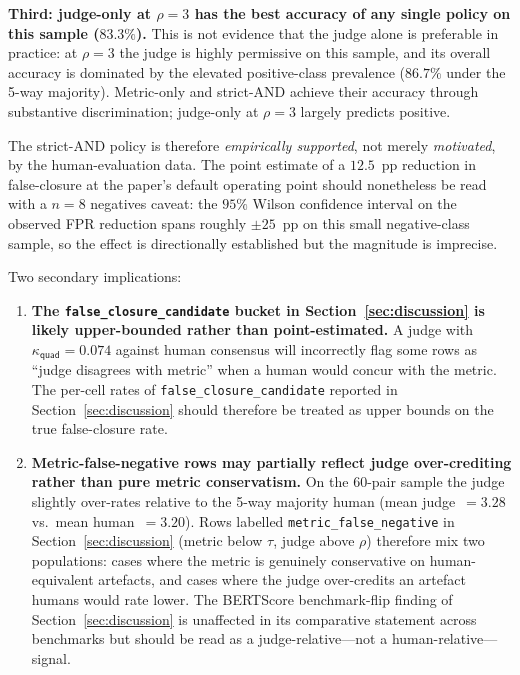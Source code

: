 \textbf{Third: judge-only at $\rho = 3$ has the best accuracy of any
single policy on this sample ($83.3\%$).} This is not evidence that the
judge alone is preferable in practice: at $\rho = 3$ the judge is
highly permissive on this sample, and its overall accuracy is dominated
by the elevated positive-class prevalence ($86.7\%$ under the 5-way
majority). Metric-only and strict-AND achieve their accuracy through
substantive discrimination; judge-only at $\rho = 3$ largely predicts
positive.

The strict-AND policy is therefore \emph{empirically supported}, not
merely \emph{motivated}, by the human-evaluation data. The point
estimate of a $12.5$~pp reduction in false-closure at the paper's
default operating point should nonetheless be read with a $n = 8$
negatives caveat: the $95\%$ Wilson confidence interval on the observed
FPR reduction spans roughly $\pm 25$~pp on this small negative-class
sample, so the effect is directionally established but the magnitude
is imprecise.

Two secondary implications:

\begin{enumerate}
  \item \textbf{The \texttt{false\_closure\_candidate} bucket in
        Section~\ref{sec:discussion} is likely upper-bounded rather
        than point-estimated.} A judge with $\kappa_{\textsf{quad}}
        = 0.074$ against human consensus will incorrectly flag some
        rows as ``judge disagrees with metric'' when a human would
        concur with the metric. The per-cell rates of
        \texttt{false\_closure\_candidate} reported in
        Section~\ref{sec:discussion} should therefore be treated as
        upper bounds on the true false-closure rate.

  \item \textbf{Metric-false-negative rows may partially reflect
        judge over-crediting rather than pure metric conservatism.}
        On the 60-pair sample the judge slightly over-rates relative
        to the 5-way majority human (mean judge~$= 3.28$ vs.\ mean
        human~$= 3.20$). Rows labelled \texttt{metric\_false\_negative}
        in Section~\ref{sec:discussion} (metric below $\tau$, judge
        above $\rho$) therefore mix two populations: cases where the
        metric is genuinely conservative on human-equivalent artefacts,
        and cases where the judge over-credits an artefact humans would
        rate lower. The BERTScore benchmark-flip finding of
        Section~\ref{sec:discussion} is unaffected in its comparative
        statement across benchmarks but should be read as a
        judge-relative---not a human-relative---signal.
\end{enumerate}

